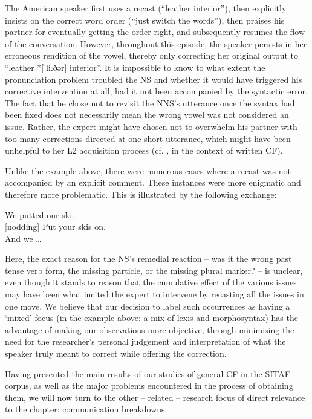 \documentclass[output=paper,colorlinks,citecolor=brown,modfonts,nonflat]{../langscibook}
\begin{document}
The American speaker first uses a recast (“leather interior”), then explicitly insists on the correct word order (“just switch the words”), then praises his  partner for eventually getting the order right, and subsequently resumes the flow of the conversation. However, throughout this episode, the  speaker persists in her erroneous rendition of the vowel, thereby only correcting her original output to “leather *['liːðər] interior”. It is impossible to know to what extent the pronunciation problem troubled the NS and whether it would have triggered his corrective intervention at all, had it not been accompanied by the syntactic error. The fact that he chose not to revisit the NNS’s utterance once the syntax had been fixed does not necessarily mean the wrong vowel was not considered an issue. Rather, the expert might have chosen not to overwhelm his partner with too many corrections directed at one short utterance, which might have been unhelpful to her L2 acquisition process (cf. \citealt{EllisEtAl2008}, in the context of written CF).



Unlike the example above, there were numerous cases where a recast was not accompanied by an explicit comment. These instances were more enigmatic and therefore more problematic. This is illustrated by the following exchange:


\ea\label{ex:scheuer:12}
{\NNS} {We} {putted} {our} {ski.}\\
{\NS} [nodding] {Put} {your} {skis} {on.}\\
{\NNS} {And} {we} {…}
\z


Here, the exact reason for the NS’s remedial reaction – was it the wrong past tense verb form, the missing particle, or the missing plural marker? – is unclear, even though it stands to reason that the cumulative effect of the various issues may have been what incited the expert to intervene by recasting all the issues in one move. We believe that our decision to label such occurrences as having a ‘mixed’ focus (in the example above: a mix of lexis and morphosyntax) has the advantage of making our observations more objective, through minimising the need for the researcher’s personal judgement and interpretation of what the speaker truly meant to correct while offering the correction. 



Having presented the main results of our studies of general CF in the SITAF corpus, as well as the major problems encountered in the process of obtaining them, we will now turn to the other – related – research focus of direct relevance to the chapter: communication breakdowns. 
\end{document}
